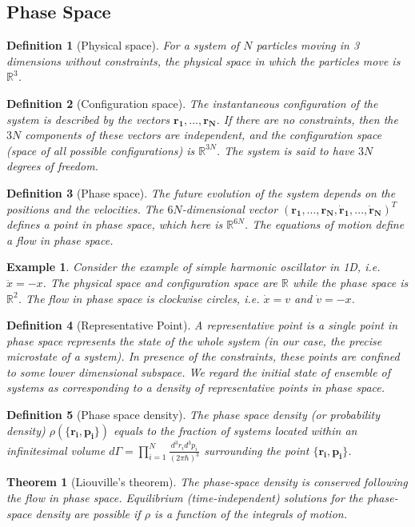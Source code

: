 \documentclass[a4paper]{article}
\newtheorem{eg}{Example}[section]
\theoremstyle{new}
\newtheorem{defi}{Definition}[section]
\newtheorem{thm}{Theorem}[section]
\begin{document}
\subsection{Phase Space}
\begin{defi}[Physical space]
For a system of $N$ particles moving in 3 dimensions without constraints, the physical space in which the particles move is $\mathbb{R}^3$.
\end{defi}
\begin{defi}[Configuration space]
The instantaneous configuration of the system is described by the vectors $\mathbf{r_1},...,\mathbf{r_N}$. If there are no constraints, then the $3N$ components of these vectors are independent, and the configuration space (space of all possible configurations) is $\mathbb{R}^{3N}$. The system is said to have $3N$ degrees of freedom.
\end{defi}
\begin{defi}[Phase space]
The future evolution of the system depends on the positions and the velocities. The $6N$-dimensional vector $(\mathbf{r_1},...,\mathbf{r_N},\mathbf{\dot{r}_1},...,\mathbf{\dot{r}_N})^T$ defines a point in phase space, which here is $\mathbb{R}^{6N}$. The equations of motion define a flow in phase space.
\end{defi}
\begin{eg}
Consider the example of simple harmonic oscillator in 1D, i.e. $\ddot{x}=-x$. The physical space and configuration space are $\mathbb{R}$ while the phase space is $\mathbb{R}^2$. The flow in phase space is clockwise circles, i.e. $\dot{x}=v$ and $\dot{v}=-x$.
\end{eg}
\begin{defi}[Representative Point]
A representative point is a single point in phase space represents the state of the whole system (in our case, the precise microstate of a system). In presence of the constraints, these points are confined to some lower dimensional subspace. We regard the initial state of ensemble of systems as corresponding to a density of representative points in phase space.
\end{defi}
\begin{defi}[Phase space density]
The phase space density (or probability density) $\rho(\{\mathbf{r_i},\mathbf{p_i}\})$ equals to the fraction of systems located within an infinitesimal volume $d\Gamma=\prod_{i=1}^N\frac{d^3r_id^3p_i}{(2\pi\hbar)^3}$ surrounding the point $\{\mathbf{r_i},\mathbf{p_i}\}$.
\end{defi}
\begin{thm}[Liouville's theorem]
The phase-space density is conserved following the flow in phase space. Equilibrium (time-independent) solutions for the phase-space density are possible if $\rho$ is a function of the integrals of motion. 
\end{thm}
\end{document}
